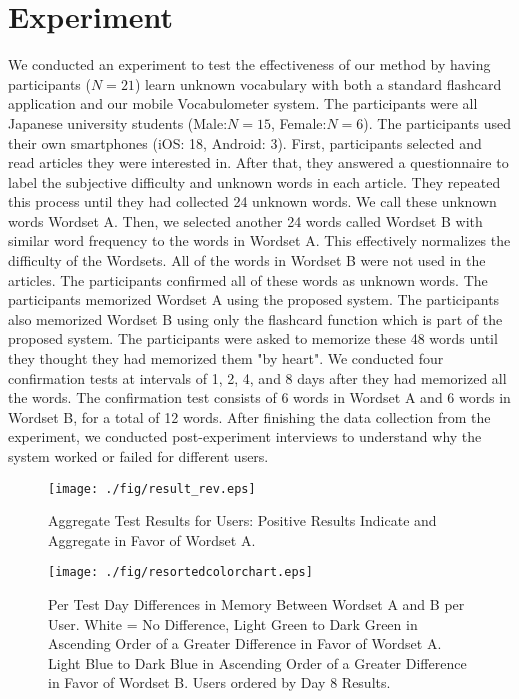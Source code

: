\documentclass[sigchi]{acmart}
\begin{document}
\section{Experiment}
We conducted an experiment to test the effectiveness of our method by having participants ($N=21$) learn unknown vocabulary with both a standard flashcard application and our mobile Vocabulometer system. The participants were all Japanese university students (Male:$N=15$, Female:$N=6$). The participants used their own smartphones (iOS: 18, Android: 3). First, participants selected and read articles they were interested in. After that, they answered a questionnaire to label the subjective difficulty and unknown words in each article. They repeated this process until they had collected 24 unknown words. We call these unknown words Wordset A. Then, we 
selected another 24 words called Wordset B with similar word frequency to the words in Wordset A. This effectively normalizes the difficulty of the Wordsets. All of the words in Wordset B were not used in the articles. The participants confirmed all of these words as unknown words. The participants memorized Wordset A using the proposed system. The participants also memorized Wordset B using only the flashcard function which is part of the proposed system. The participants were asked to memorize these 48 words until they thought they had memorized them "by heart". We conducted four confirmation tests at intervals of 1, 2, 4, and 8 days after they had memorized all the words. The confirmation test consists of 6 words in Wordset A and 6 words in Wordset B, for a total of 12 words. After finishing the data collection from the experiment, we conducted post-experiment interviews to understand why the system worked or failed for different users. 
\begin{figure}[!t]
    \centering
    \texttt{[image: ./fig/result\_rev.eps]}
    \caption{Aggregate Test Results for Users: Positive Results Indicate and Aggregate in Favor of Wordset A.}
    \label{fig:result}
\end{figure}

\begin{figure}[!t]
    \centering
    \texttt{[image: ./fig/resortedcolorchart.eps]}
    \caption{Per Test Day Differences in Memory Between Wordset A and B per User. White = No Difference, Light Green to Dark Green in Ascending Order of a Greater Difference in Favor of Wordset A. Light Blue to Dark Blue in Ascending Order of a Greater Difference in Favor of Wordset B. Users ordered by Day 8 Results.}
    \label{fig:colorchart}
\end{figure}
\end{document}
